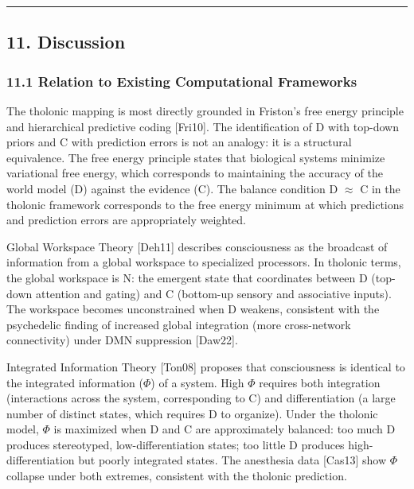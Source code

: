 \documentclass[
  11pt,
  letterpaper,
]{article}
\begin{document}
\begin{center}\rule{0.5\linewidth}{0.5pt}\end{center}

\subsection{11. Discussion}\label{discussion}

\subsubsection{11.1 Relation to Existing Computational
Frameworks}\label{relation-to-existing-computational-frameworks}

The tholonic mapping is most directly grounded in Friston's free energy
principle and hierarchical predictive coding {[}Fri10{]}. The
identification of D with top-down priors and C with prediction errors is
not an analogy: it is a structural equivalence. The free energy
principle states that biological systems minimize variational free
energy, which corresponds to maintaining the accuracy of the world model
(D) against the evidence (C). The balance condition D \(\approx\) C in
the tholonic framework corresponds to the free energy minimum at which
predictions and prediction errors are appropriately weighted.

Global Workspace Theory {[}Deh11{]} describes consciousness as the
broadcast of information from a global workspace to specialized
processors. In tholonic terms, the global workspace is N: the emergent
state that coordinates between D (top-down attention and gating) and C
(bottom-up sensory and associative inputs). The workspace becomes
unconstrained when D weakens, consistent with the psychedelic finding of
increased global integration (more cross-network connectivity) under DMN
suppression {[}Daw22{]}.

Integrated Information Theory {[}Ton08{]} proposes that consciousness is
identical to the integrated information (\(\Phi\)) of a system. High
\(\Phi\) requires both integration (interactions across the system,
corresponding to C) and differentiation (a large number of distinct
states, which requires D to organize). Under the tholonic model,
\(\Phi\) is maximized when D and C are approximately balanced: too much
D produces stereotyped, low-differentiation states; too little D
produces high-differentiation but poorly integrated states. The
anesthesia data {[}Cas13{]} show \(\Phi\) collapse under both extremes,
consistent with the tholonic prediction.
\end{document}
